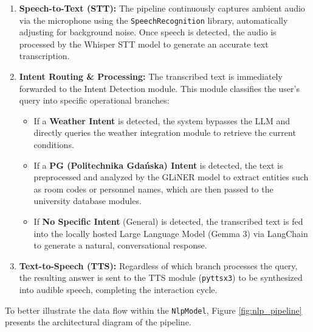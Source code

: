 \documentclass{article}
\begin{document}
	\begin{enumerate}
		\item \textbf{Speech-to-Text (STT):} The pipeline continuously captures ambient audio via the microphone using the \texttt{SpeechRecognition} library, automatically adjusting for background noise. Once speech is detected, the audio is processed by the Whisper STT model to generate an accurate text transcription.
		\item \textbf{Intent Routing \& Processing:} The transcribed text is immediately forwarded to the Intent Detection module. This module classifies the user's query into specific operational branches:
		\begin{itemize}
			\item If a \textbf{Weather Intent} is detected, the system bypasses the LLM and directly queries the weather integration module to retrieve the current conditions.
			\item If a \textbf{PG (Politechnika Gdańska) Intent} is detected, the text is preprocessed and analyzed by the GLiNER model to extract entities such as room codes or personnel names, which are then passed to the university database modules.
			\item If \textbf{No Specific Intent} (General) is detected, the transcribed text is fed into the locally hosted Large Language Model (Gemma 3) via LangChain to generate a natural, conversational response.
		\end{itemize}
		\item \textbf{Text-to-Speech (TTS):} Regardless of which branch processes the query, the resulting answer is sent to the TTS module (\texttt{pyttsx3}) to be synthesized into audible speech, completing the interaction cycle.
	\end{enumerate}
	
	To better illustrate the data flow within the \texttt{NlpModel}, Figure \ref{fig:nlp_pipeline} presents the architectural diagram of the pipeline.
	
\end{document}

